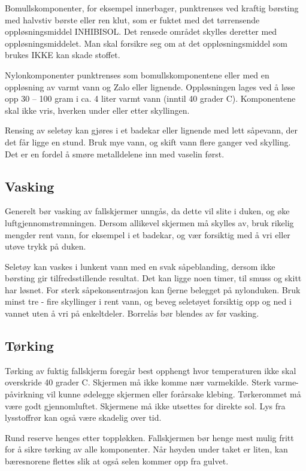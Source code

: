 Bomullskomponenter, for eksempel innerbager, punktrenses ved kraftig børsting med halvstiv børste eller ren klut, som er fuktet med det tørrensende oppløsningsmiddel INHIBISOL. Det rensede området skylles deretter med oppløsningsmiddelet. Man skal forsikre seg om at det oppløsningsmiddel som brukes IKKE kan skade stoffet.

Nylonkomponenter punktrenses som bomullskomponentene eller med en oppløsning av varmt vann og Zalo eller lignende. Oppløsningen lages ved å løse opp 30 – 100 gram i ca. 4 liter varmt vann (inntil 40 grader C). Komponentene skal ikke vris, hverken under eller etter skyllingen.

Rensing av seletøy kan gjøres i et badekar eller lignende med lett såpevann, der det får ligge en stund. Bruk mye vann, og skift vann flere ganger ved skylling. Det er en fordel å smøre metalldelene inn med vaselin først.

\subsection{Vasking}
Generelt bør vasking av fallskjermer unngås, da dette vil slite i duken, og øke luftgjennomstrømningen. Dersom allikevel skjermen må skylles av, bruk rikelig mengder rent vann, for eksempel i et badekar, og vær forsiktig med å vri eller utøve trykk på duken.

Seletøy kan vaskes i lunkent vann med en svak såpeblanding, dersom ikke børsting gir tilfredsstillende resultat. Det kan ligge noen timer, til smuss og skitt har løsnet. For sterk såpekonsentrasjon kan fjerne belegget på nylonduken. Bruk minst tre - fire skyllinger i rent vann, og beveg seletøyet forsiktig opp og ned i vannet uten å vri på enkeltdeler. Borrelås bør blendes av før vasking.

\subsection{Tørking}
Tørking av fuktig fallskjerm foregår best opphengt hvor temperaturen ikke skal overskride 40 grader C. Skjermen må ikke komme nær varmekilde. Sterk varme- påvirkning vil kunne ødelegge skjermen eller forårsake klebing. Tørkerommet må være godt gjennomluftet. Skjermene må ikke utsettes for direkte sol. Lys fra lysstoffrør kan også være skadelig over tid.

Rund reserve henges etter toppløkken. Fallskjermen bør henge mest mulig fritt for å sikre tørking av alle komponenter. Når høyden under taket er liten, kan bæresnorene flettes slik at også selen kommer opp fra gulvet.

